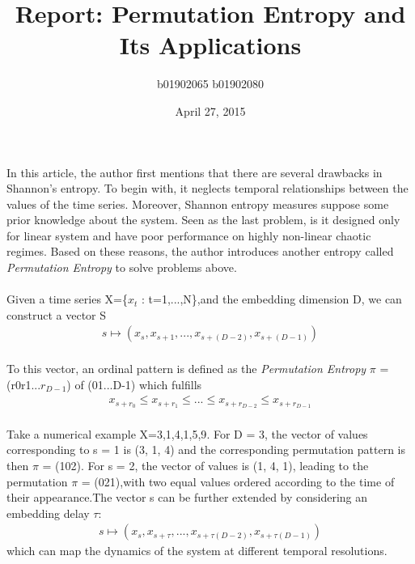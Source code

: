 \documentclass{article}
\title{Report: Permutation Entropy and Its Applications}
\date{April 27, 2015}
\author{b01902065 \quad b01902080}
\begin{document}
\maketitle

\paragraph{}
In this article, the author first mentions that there are several drawbacks in Shannon's entropy. To begin with, it neglects temporal relationships between the values of the time series. Moreover, Shannon entropy measures suppose some prior knowledge about the system. Seen as the last problem, is it designed only for linear system and have poor performance on highly non-linear chaotic regimes.
Based on these reasons, the author introduces another entropy called {\it Permutation Entropy} to solve problems above.   
\paragraph{}
Given a time series X=\{$x_t$ : t=1,...,N\},and the embedding dimension D, we can construct a vector S
\begin{align*} 
s\mapsto (x_s,x_{s+1},...,x_{s+(D-2)},x_{s+(D-1)})
\end{align*}
\paragraph{}
To this vector, an ordinal pattern is defined as the {\it Permutation Entropy} $\pi$ =(r0r1...$r_{D-1}$) of (01...D-1) which fulfills 
\begin{align*} 
x_{s+r_0} \leq x_{s+r_1}\leq...\leq x_{s+r_{D-2}} \leq x_{s+r_{D-1}}
\end{align*}
\paragraph{}
Take a numerical example X={3,1,4,1,5,9}. For D = 3, the vector of values corresponding
to s = 1 is (3, 1, 4) and the corresponding
permutation pattern is then $\pi$ = (102). For s = 2, the vector of values is (1, 4, 1), leading to the
permutation $\pi$ = (021),with two equal values ordered according to the time of their appearance.The vector s can be further extended by considering an embedding delay $\tau$:
\begin{align*} 
s\mapsto (x_s,x_{s+\tau},...,x_{s+\tau (D-2)},x_{s+\tau (D-1)})
\end{align*} 
which can map the dynamics of the system at different temporal resolutions.
\end{document}
